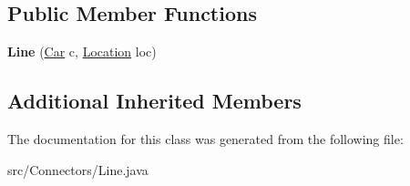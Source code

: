 \subsection*{Public Member Functions}
\begin{DoxyCompactItemize}
\item 
\hypertarget{classConnectors_1_1Line_a400eaf106f8186364983486592e01707}{}{\bfseries Line} (\hyperlink{classCars_1_1Car}{Car} c, \hyperlink{enumEnums_1_1Location}{Location} loc)\label{classConnectors_1_1Line_a400eaf106f8186364983486592e01707}

\end{DoxyCompactItemize}
\subsection*{Additional Inherited Members}


The documentation for this class was generated from the following file\+:\begin{DoxyCompactItemize}
\item 
src/\+Connectors/Line.\+java\end{DoxyCompactItemize}

